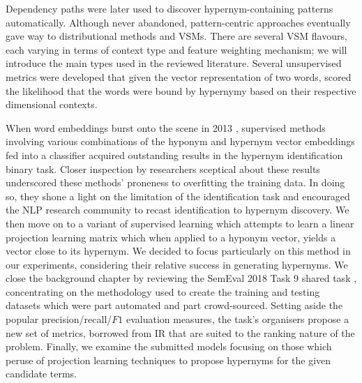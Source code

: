 Dependency paths were later used to discover hypernym-containing patterns automatically.  Although never abandoned, pattern-centric approaches eventually gave way to distributional methods and \acl{VSM}s.  There are several \ac{VSM} flavours, each varying in terms of context type and feature weighting mechanism; we will introduce the main types used in the reviewed literature.  Several unsupervised metrics were developed that given the vector representation of two words, scored the likelihood that the words were bound by hypernymy based on their respective dimensional contexts.

When word embeddings burst onto the scene in 2013 \citep{mikolov2013distributed}, supervised methods involving various combinations of the hyponym and hypernym vector embeddings fed into a classifier acquired outstanding results in the hypernym identification binary task.  Closer inspection by researchers sceptical about these results underscored these methods’ proneness to overfitting the training data. In doing so, they shone a light on the limitation of the identification task and encouraged the NLP research community to recast identification to hypernym discovery.  We then move on to a variant of supervised learning which attempts to learn a linear projection learning matrix which when applied to a hyponym vector, yields a vector close to its hypernym.  We decided to focus particularly on this method in our experiments, considering their relative success in generating hypernyms.  
We close the background chapter by reviewing the SemEval 2018 Task 9 shared task \citep{camacho2018semeval}, concentrating on the methodology used to create the training and testing datasets which were part automated and part crowd-sourced.  Setting aside the popular precision/recall/\(F1\) evaluation measures, the task’s organisers propose a new set of metrics, borrowed from \ac{IR} that are suited to the ranking nature of the problem.  Finally, we examine the submitted models focusing on those which peruse of projection learning techniques to propose hypernyms for the given candidate terms.
